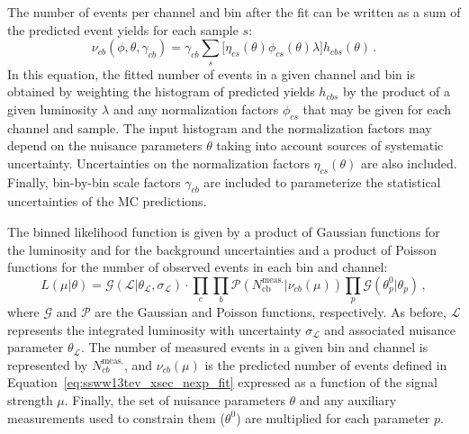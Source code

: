 The number of events per channel and bin after the fit can be written as a sum of the predicted event yields for each sample $s$:
\begin{equation}
  \nu_{cb}(\phi,\theta,\gamma_{cb}) = \gamma_{cb}\sum\limits_{s}\big[\eta_{cs}(\theta)\phi_{cs}(\theta)\lambda\big] h_{cbs}(\theta)\,.
  \label{eq:ssww13tev_xsec_nexp_fit}
\end{equation}
In this equation, the fitted number of events in a given channel and bin is obtained by weighting the histogram of predicted yields $h_{cbs}$ by the product of a given luminosity $\lambda$ and any normalization factors $\phi_{cs}$ that may be given for each channel and sample.
The input histogram and the normalization factors may depend on the nuisance parameters $\theta$ taking into account sources of systematic uncertainty.
Uncertainties on the normalization factors $\eta_{cs}(\theta)$ are also included.
Finally, bin-by-bin scale factors $\gamma_{cb}$ are included to parameterize the statistical uncertainties of the MC predictions.

The binned likelihood function is given by a product of Gaussian functions for the luminosity and for the background uncertainties and a product of Poisson functions for the number of observed events in each bin and channel:
\begin{equation}
  L(\mu|\theta) = \mathcal{G}(\mathcal{L}|\theta_{\mathcal{L}},\sigma_{\mathcal{L}})\cdot \prod\limits_{c}\prod\limits_{b}\mathcal{P}(N_{\textrm{cb}}^{\textrm{meas.}}|\nu_{cb}(\mu))\prod\limits_{p}\mathcal{G}(\theta_{p}^{0}|\theta_{p})\,,
\end{equation}
where $\mathcal{G}$ and $\mathcal{P}$ are the Gaussian and Poisson functions, respectively.
As before, $\mathcal{L}$ represents the integrated luminosity with uncertainty $\sigma_{\mathcal{L}}$ and associated nuisance parameter $\theta_{\mathcal{L}}$.
The number of measured events in a given bin and channel is represented by $N_{cb}^{\textrm{meas.}}$, and $\nu_{cb}(\mu)$ is the predicted number of events defined in Equation~\ref{eq:ssww13tev_xsec_nexp_fit} expressed as a function of the signal strength $\mu$.
Finally, the set of nuisance parameters $\theta$ and any auxiliary measurements used to constrain them ($\theta^0$) are multiplied for each parameter $p$.

